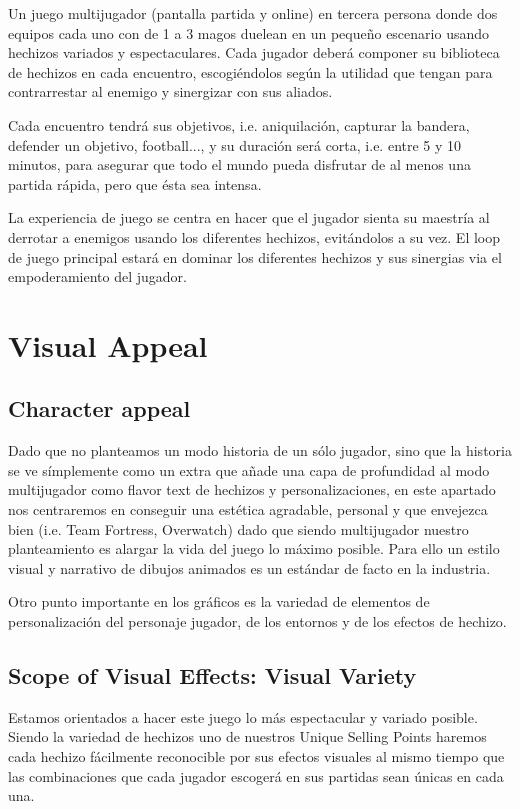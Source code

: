 \documentclass[12pt]{article}
\begin{document}
Un juego multijugador (pantalla partida y online) en tercera persona donde dos equipos cada uno con de 1 a 3 magos duelean en un pequeño escenario usando hechizos variados y espectaculares. Cada jugador deberá componer su biblioteca de hechizos en cada encuentro, escogiéndolos según la utilidad que tengan para contrarrestar al enemigo y sinergizar con sus aliados. 

Cada encuentro tendrá sus objetivos, i.e. aniquilación, capturar la bandera, defender un objetivo, football..., y su duración será corta, i.e. entre 5 y 10 minutos, para asegurar que todo el mundo pueda disfrutar de al menos una partida rápida, pero que ésta sea intensa.

La experiencia de juego se centra en hacer que el jugador sienta su maestría al derrotar a enemigos usando los diferentes hechizos, evitándolos a su vez. El loop de juego principal estará en dominar los diferentes hechizos y sus sinergias via el empoderamiento del jugador.

\newpage

\section{Visual Appeal}

\subsection{Character appeal}

Dado que no planteamos un modo historia de un sólo jugador, sino que la historia se ve símplemente como un extra que añade una capa de profundidad al modo multijugador como flavor text de hechizos y personalizaciones, en este apartado nos centraremos en conseguir una estética agradable, personal y que envejezca bien (i.e. Team Fortress, Overwatch) dado que siendo multijugador nuestro planteamiento es alargar la vida del juego lo máximo posible. Para ello un estilo visual y narrativo de dibujos animados es un estándar de facto en la industria.

Otro punto importante en los gráficos es la variedad de elementos de personalización del personaje jugador, de los entornos y de los efectos de hechizo.

\subsection{Scope of Visual Effects: Visual Variety}

Estamos orientados a hacer este juego lo más espectacular y variado posible. Siendo la variedad de hechizos uno de nuestros Unique Selling Points haremos cada hechizo fácilmente reconocible por sus efectos visuales al mismo tiempo que las combinaciones que cada jugador escogerá en sus partidas sean únicas en cada una.
\end{document}

